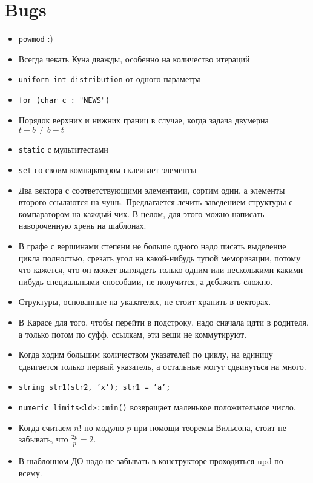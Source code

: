 \section{Bugs}

\begin{itemize}
	\item \texttt{powmod} :)

	\item Всегда чекать Куна дважды, особенно на количество итераций

	\item \texttt{uniform_int_distribution} от одного параметра

	\item \texttt{for (char c : "NEWS")}

	\item Порядок верхних и нижних границ в случае, когда задача двумерна
		$t - b \neq b - t$

	\item \texttt{static} с мультитестами

	\item \texttt{set} со своим компаратором склеивает элементы

	\item Два вектора с соответствующими элементами, сортим один, а элементы
		второго ссылаются на чушь. Предлагается лечить заведением структуры с
		компаратором на каждый чих. В целом, для этого можно написать навороченную
		хрень на шаблонах.

	\item В графе с вершинами степени не больше одного надо писать выделение
		цикла полностью, срезать угол на какой-нибудь тупой меморизации, потому
		что кажется, что он может выглядеть только одним или несколькими
		какими-нибудь специальными способами, не получится, а дебажить сложно.

	\item Структуры, основанные на указателях, не стоит хранить в векторах.

	\item В Карасе для того, чтобы перейти в подстроку, надо сначала идти в
		родителя, а только потом по суфф. ссылкам, эти вещи не коммутируют.

	\item Когда ходим большим количеством указателей по циклу, на единицу
		сдвигается только первый указатель, а остальные могут сдвинуться на много.

	\item \texttt{string str1(str2, 'x'); str1 = 'a';}

	\item \texttt{numeric_limits<ld>::min()} возвращает маленькое положительное число.

	\item Когда считаем $n!$ по модулю $p$ при помощи теоремы Вильсона, стоит не забывать, что $\frac{2p}{p} = 2$.

	\item В шаблонном ДО надо не забывать в конструкторе проходиться upd по всему.
\end{itemize}
